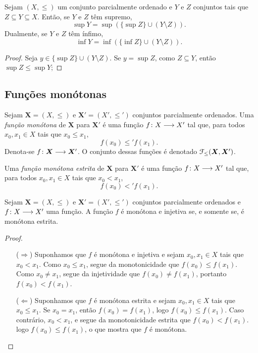 \begin{proposition}
	Sejam $(X,\leq)$ um conjunto parcialmente ordenado e $Y$ e $Z$ conjuntos tais que $Z \subseteq Y \subseteq X$. Então, se $Y$ e $Z$ têm supremo,
	\begin{equation*}
	\sup Y = \sup(\{\sup Z\} \cup (Y \setminus Z)).
	\end{equation*}
Dualmente, se $Y$ e $Z$ têm ínfimo,
	\begin{equation*}
	\inf Y = \inf(\{\inf Z\} \cup (Y \setminus Z)).
	\end{equation*}
\end{proposition}
\begin{proof}
	Seja $y \in \{\sup Z\} \cup (Y \setminus Z)$. Se $y = \sup Z$, como $Z \subseteq Y$, então $\sup Z \leq \sup Y$; 
\end{proof}

\subsection{Funções monótonas}

\begin{definition}
	Sejam $\bm X = (X,\leq)$ e $\bm X' = (X',\leq')$ conjuntos parcialmente ordenados. Uma \emph{função monótona} de $\bm X$ para $\bm X'$ é uma função ${f}\colon {X} \longrightarrow {X'}$ tal que, para todos $x_0,x_1 \in X$ tais que $x_0 \leq x_1$,
		\begin{equation*}
		f(x_0) \leq' f(x_1).
		\end{equation*}
	Denota-se ${f}\colon {\bm X} \longrightarrow {\bm X'}$. O conjunto dessas funções é denotado $\mathcal{F}_\leq(\bm X, \bm X')$.

	Uma \emph{função monótona estrita} de $\bm X$ para $\bm X'$ é uma função ${f}\colon {X} \longrightarrow {X'}$ tal que, para todos $x_0,x_1 \in X$ tais que $x_0 < x_1$,
		\begin{equation*}
		f(x_0) <' f(x_1).
		\end{equation*}
\end{definition}

\begin{exercise}
	Sejam $\bm X = (X,\leq)$ e $\bm X' = (X',\leq')$ conjuntos parcialmente ordenados e ${f}\colon {X} \longrightarrow {X'}$ uma função. A função $f$ é monótona e injetiva se, e somente se, é monótona estrita.
\end{exercise}
\begin{proof}
	\begin{enumerate}
		\item [($\Rightarrow$)] Suponhamos que $f$ é monótona e injetiva e sejam $x_0,x_1 \in X$ tais que $x_0 < x_1$. Como $x_0 \leq x_1$, segue da monotonicidade que $f(x_0) \leq f(x_1)$. Como $x_0 \neq x_1$, segue da injetividade que $f(x_0) \neq f(x_1)$, portanto $f(x_0) < f(x_1)$.
		
		\item [($\Leftarrow$)] Suponhamos que $f$ é monótona estrita e sejam $x_0,x_1 \in X$ tais que $x_0 \leq x_1$. Se $x_0 = x_1$, então $f(x_0) = f(x_1)$, logo $f(x_0) \leq f(x_1)$. Caso contrário, $x_0 < x_1$, e segue da monotonicidade estrita que $f(x_0) < f(x_1)$. logo $f(x_0) \leq f(x_1)$, o que mostra que $f$ é monótona.
	\end{enumerate}
\end{proof}

